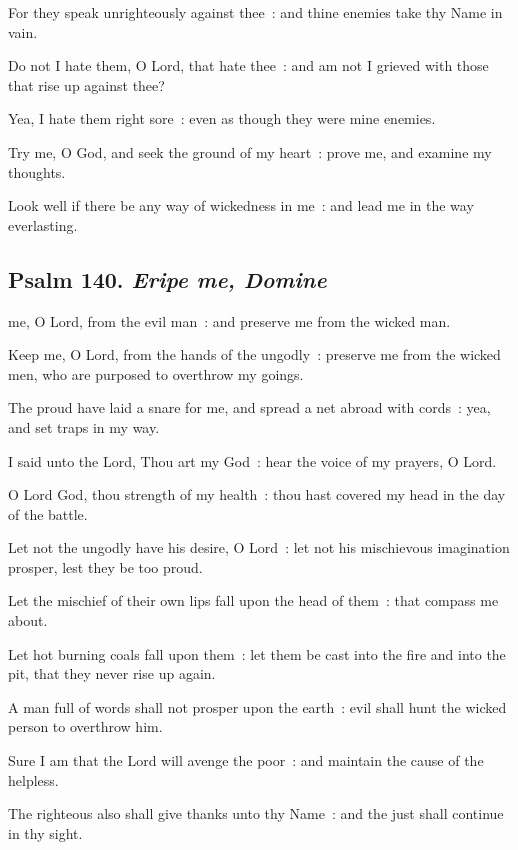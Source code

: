 For they speak unrighteously against thee~: and thine enemies take thy Name in vain.\par
{}Do not I hate them, O Lord, that hate thee~: and am not I grieved with those that rise up against thee?\par
{}Yea, I hate them right sore~: even as though they were mine enemies.\par
{}Try me, O God, and seek the ground of my heart~: prove me, and examine my thoughts.\par
{}Look well if there be any way of wickedness in me~: and lead me in the way everlasting.\par


\subsection{Psalm 140. \textit{Eripe me, Domine}}


 me, O Lord, from the evil man~: and preserve me from the wicked man.\par
{}
Keep me, O Lord, from the hands of the ungodly~: preserve me from the wicked men, who are purposed to overthrow my goings.\par
{}The proud have laid a snare for me, and spread a net abroad with cords~: yea, and set traps in my way.\par
{}I said unto the Lord, Thou art my God~: hear the voice of my prayers, O Lord.\par
{}O Lord God, thou strength of my health~: thou hast covered my head in the day of the battle.\par
{}Let not the ungodly have his desire, O Lord~: let not his mischievous imagination prosper, lest they be too proud.\par
{}Let the mischief of their own lips fall upon the head of them~: that compass me about.\par
{}Let hot burning coals fall upon them~: let them be cast into the fire and into the pit, that they never rise up again.\par
{}A man full of words shall not prosper upon the earth~: evil shall hunt the wicked person to overthrow him.\par
{}Sure I am that the Lord will avenge the poor~: and maintain the cause of the helpless.\par
{}The righteous also shall give thanks unto thy Name~: and the just shall continue in thy sight.\par


